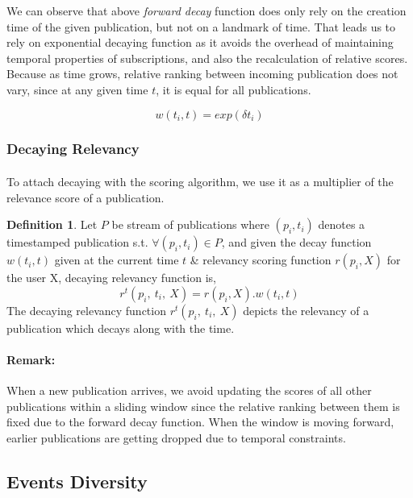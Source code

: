 \documentclass[a4paper,12pt,oneside]{book}
\theoremstyle{definition}
\newtheorem{definition}{Definition}[section]
\theoremstyle{remark}
\begin{document}
We can observe that above \emph{forward decay} function does only rely on the creation time of the given publication, but not on a landmark of time. That leads us to rely on exponential decaying function as it avoids the overhead of maintaining temporal properties of subscriptions, and also the recalculation of relative scores. Because as time grows, relative ranking between incoming publication does not vary, since at any given time $t$, it is equal for all publications. 

\begin{center}
\[ w(t_i, t)= exp( \delta t_i) \]
\end{center}

\subsubsection{Decaying Relevancy}
\label{sec:decayrel}
\paragraph*{}
To attach decaying with the scoring algorithm, we use it as a multiplier of the relevance score of a publication.

\begin{definition}
Let $P$ be stream of publications where $(p_i, t_i)$ denotes a timestamped publication s.t. $ \forall (p_i, t_i) \in P$, and given the decay function $w(t_i, t)$ given at the current time $t$ \& relevancy scoring function $r(p_i,X)$ for the user X, decaying relevancy function is,
\[ r^t(p_i,\ t_i,\ X)=r(p_i,X).w(t_i, t)\]
The decaying relevancy function $r^t(p_i,\ t_i,\ X)$ depicts the relevancy of a publication which decays along with the time. 
\end{definition}


\paragraph*{Remark:} When a new publication arrives, we avoid updating the scores of all other publications within a sliding window since the relative ranking between them is fixed due to the forward decay function. When the window is moving forward, earlier publications are getting dropped due to temporal constraints.

\subsection{Events Diversity}
\end{document}
